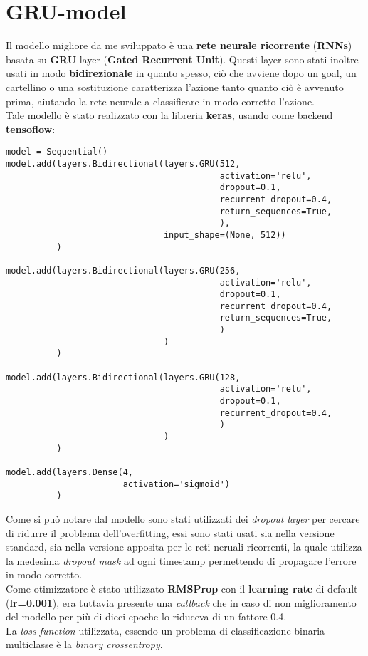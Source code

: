 \section{GRU-model}
\label{section : grumodel}
Il modello migliore da me sviluppato è una \textbf{rete neurale ricorrente} (\textbf{RNNs}) basata su \textbf{GRU} layer (\textbf{Gated Recurrent Unit}). Questi layer sono stati inoltre usati in modo \textbf{bidirezionale} in quanto spesso, ciò che avviene dopo un goal, un cartellino o una sostituzione caratterizza l'azione tanto quanto ciò è avvenuto prima, aiutando la rete neurale a classificare in modo corretto l'azione.
\\Tale modello è stato realizzato con la libreria \textbf{keras}, usando come backend \textbf{tensoflow}:
\begin{verbatim}
model = Sequential()
model.add(layers.Bidirectional(layers.GRU(512,
                                          activation='relu',
                                          dropout=0.1,
                                          recurrent_dropout=0.4,
                                          return_sequences=True,
                                          ),
                               input_shape=(None, 512))
          )

model.add(layers.Bidirectional(layers.GRU(256,
                                          activation='relu',
                                          dropout=0.1,
                                          recurrent_dropout=0.4,
                                          return_sequences=True,
                                          )
                               )
          )

model.add(layers.Bidirectional(layers.GRU(128,
                                          activation='relu',
                                          dropout=0.1,
                                          recurrent_dropout=0.4,
                                          )
                               )
          )

model.add(layers.Dense(4,
                       activation='sigmoid')
          )
\end{verbatim}
Come si può notare dal modello sono stati utilizzati dei \textit{dropout layer} per cercare di ridurre il problema dell'overfitting, essi sono stati usati sia nella versione standard, sia nella versione apposita per le reti neruali ricorrenti, la quale utilizza la medesima \textit{dropout mask} ad ogni timestamp permettendo di propagare l'errore in modo corretto.
\\Come otimizzatore è stato utilizzato \textbf{RMSProp} con il \textbf{learning rate} di default (\textbf{lr=0.001}), era tuttavia presente una \textit{callback} che in caso di non miglioramento del modello per più di dieci epoche lo riduceva di un fattore 0.4.
\\La \textit{loss function} utilizzata, essendo un problema di classificazione binaria multiclasse è la \textit{binary crossentropy}.